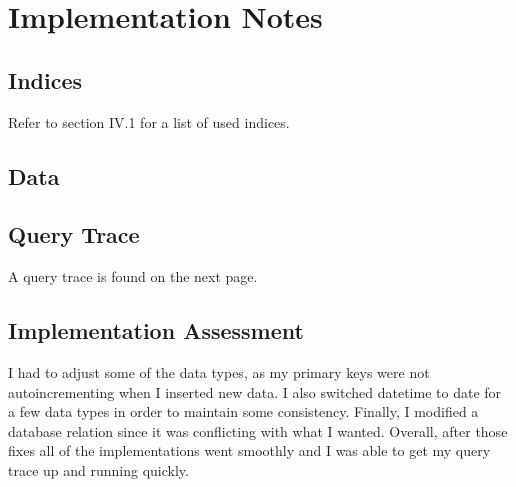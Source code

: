 \documentclass[11pt]{report}
\begin{document}
\chapter{Implementation Notes}
\section{Indices}
Refer to section IV.1 for a list of used indices.
\section{Data}

\section{Query Trace}
A query trace is found on the next page.

\section{Implementation Assessment}
I had to adjust some of the data types, as my primary keys were not autoincrementing when I inserted new data. I also switched datetime to date for a few data types in order to maintain some consistency. Finally, I modified a database relation since it was conflicting with what I wanted. Overall, after those fixes all of the implementations went smoothly and I was able to get my query trace up and running quickly.
\end{document}
